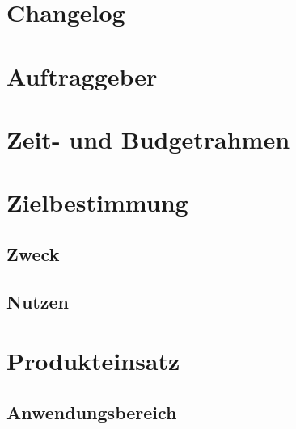 \documentclass{article}
\gdef\contentsname{Inhaltsverzeichnis}
\gdef\listfigurename{Abbildungsverzeichnis}
\gdef\listtablename{Tabellenverzeichnis}
\begin{document}
\setlength{\emergencystretch}{3em}  %

\gdef\contentsname{Inhaltsverzeichnis}
\gdef\listfigurename{Abbildungsverzeichnis}
\gdef\listtablename{Tabellenverzeichnis}

    

    \gdef\contentsname{Inhaltsverzeichnis}
    \tableofcontents
    \clearpage

    \section*{Changelog}\label{sec:changelog}
    
    \clearpage

    \setcounter{page}{1}

    \section{Auftraggeber}\label{sec:auftraggeber}
        
    \clearpage

    \section{Zeit- und Budgetrahmen}\label{sec:zeitbudget}
        
    \clearpage

    \section{Zielbestimmung}\label{sec:bestimmung}
        \subsection{Zweck}
            
        \subsection{Nutzen}
            
    \clearpage

    \section{Produkteinsatz}\label{sec:einsatz}
        \subsection{Anwendungsbereich}
        
\end{document}
